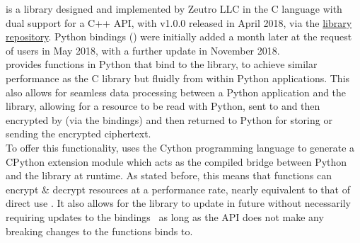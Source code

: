 \OpenABE is a library designed and implemented by Zeutro LLC in the C language with dual support for a C++ API, with v1.0.0 released in April 2018, via the \href{https://github.com/zeutro/openabe/releases}{\OpenABE library repository}. Python bindings (\PyOpenABE) were initially added a month later at the request of users in May 2018, with a further update in November 2018.\\
\PyOpenABE provides functions in Python that bind to the \OpenABE library, to achieve similar performance as the C library but fluidly from within Python applications. This also allows for seamless data processing between a Python application and the \OpenABE library, allowing for a resource to be read with Python, sent to and then encrypted by \OpenABE (via the \PyOpenABE bindings) and then returned to Python for storing or sending the encrypted ciphertext.\\
To offer this functionality, \PyOpenABE uses the Cython programming language to generate a CPython extension module which acts as the compiled bridge between Python and the \OpenABE library at runtime. As stated before, this means that \PyOpenABE functions can encrypt \& decrypt resources at a performance rate, nearly equivalent to that of direct \OpenABE use \citep{Akinyele2011}. It also allows for the \OpenABE library to update in future without necessarily requiring updates to the \PyOpenABE bindings \textemdash\ as long as the \OpenABE API does not make any breaking changes to the functions \PyOpenABE binds to.
